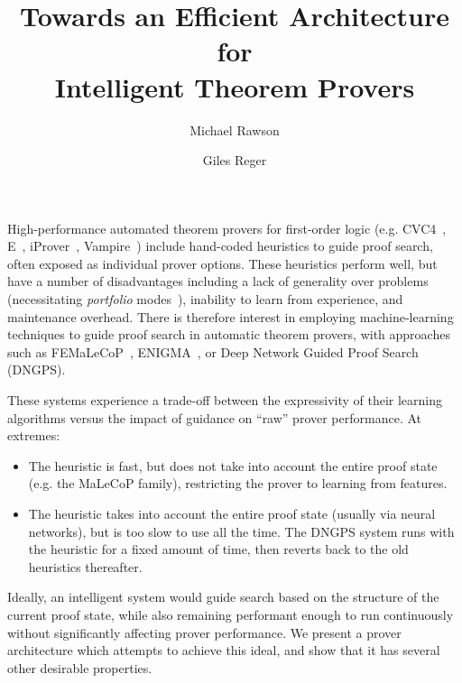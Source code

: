\documentclass{easychair}
\title{Towards an Efficient Architecture for\\ Intelligent Theorem Provers}
\author{
 Michael Rawson \and 
 Giles Reger
}
\institute{University of Manchester, Manchester, UK}
\newcommand{\Vampire}{{Vampire}}
\newcommand{\vampire}{\Vampire}
\newcommand{\iprover}{iProver}
\begin{document}
\maketitle
High-performance automated theorem provers for first-order logic (e.g. CVC4~\cite{CVC4}, E{}~\cite{E}, \iprover{}~\cite{iProver}, \vampire{}~\cite{Vampire}) include hand-coded heuristics to guide proof search, often exposed as individual prover options.
These heuristics perform well, but have a number of disadvantages including a lack of generality over problems (necessitating \emph{portfolio} modes~\cite{RawsonReger:PAAR2018,portfolio}), inability to learn from experience, and maintenance overhead.
There is therefore interest in employing machine-learning techniques to guide proof search in automatic theorem provers, with approaches such as FEMaLeCoP~\cite{femalecop}, ENIGMA~\cite{enigma}, or Deep Network Guided Proof Search~\cite{dngps} (DNGPS).

These systems experience a trade-off between the expressivity of their learning algorithms versus the impact of guidance on ``raw'' prover performance.
At extremes:

\begin{itemize}
	\item The heuristic is fast, but does not take into account the entire proof state (e.g. the MaLeCoP family), restricting the prover to learning from features.
	\item The heuristic takes into account the entire proof state (usually via neural networks), but is too slow to use all the time. The DNGPS system runs with the heuristic for a fixed amount of time, then reverts back to the old heuristics thereafter.
\end{itemize}

\noindent
Ideally, an intelligent system would guide search based on the structure of the current proof state, while also remaining performant enough to run continuously without significantly affecting prover performance.
We present a prover architecture which attempts to achieve this ideal, and show that it has several other desirable properties.
\end{document}
